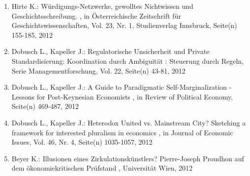 \begin{enumerate}[leftmargin=*, labelsep=0.5cm]
	 \item Hirte K.:  Würdigungs-Netzwerke, gewolltes Nichtwissen und Geschichtsschreibung.  , in Österreichische Zeitschrift für Geschichtswissenschaften, Vol. 23, Nr. 1, Studienverlag Innsbruck, Seite(n) 155-185, 2012
	 \item Dobusch L., Kapeller J.:  Regulatorische Unsicherheit und Private Standardisierung: Koordination durch Ambiguität  : Steuerung durch Regeln, Serie Managementforschung, Vol. 22, Seite(n) 43-81, 2012
	 \item Dobusch L., Kapeller J.:  A Guide to Paradigmatic Self-Marginalization - Lessons for Post-Keynesian Economists  , in Review of Political Economy, Seite(n) 469-487, 2012
	 \item Dobusch L., Kapeller J.:  Heterodox United vs. Mainstream City? Sketching a framework for interested pluralism in economics  , in Journal of Economic Issues, Vol. 46, Nr. 4, Seite(n) 1035-1057, 2012
	 \item Beyer K.:  Illusionen eines Zirkulationskünstlers? Pierre-Joseph Proudhon auf dem ökonomiekritischen Prüfstand  , Universität Wien, 2012
\end{enumerate} 
